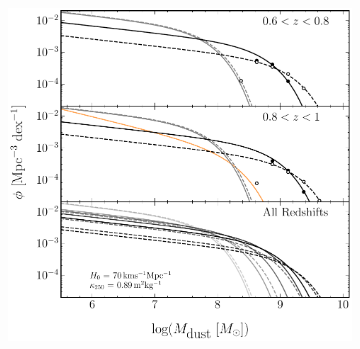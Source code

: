 \begin{figure}
    \captionsetup[subfigure]{labelformat=empty}
    \begin{subfigure}{\textwidth}
    \includegraphics[width=\columnwidth]{Figures/dmf_schechter_part2.pdf}
    \end{subfigure}
\end{figure}



